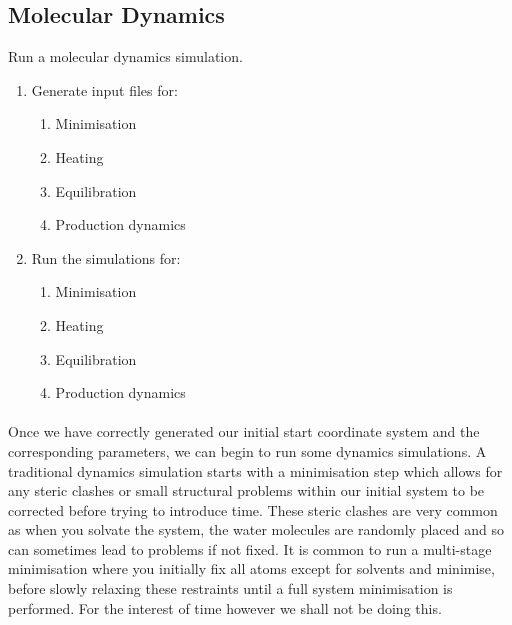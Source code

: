 \subsection{Molecular Dynamics}

    \begin{task}[label=task:Dynamics]{Run a molecular dynamics simulation.}
        \begin{enumerate}[label=(\alph*)]
            \item Generate input files for:
            \begin{enumerate}[label=(\roman*)]
                \item Minimisation
                \item Heating
                \item Equilibration
                \item Production dynamics
            \end{enumerate}
            \item Run the simulations for:
            \begin{enumerate}[label=(\roman*)]
                \item Minimisation
                \item Heating
                \item Equilibration
                \item Production dynamics
            \end{enumerate}
        \end{enumerate}
    \end{task}


    \paragraph{}
        Once we have correctly generated our initial start coordinate system and the corresponding parameters, we can begin to run some dynamics simulations. A traditional dynamics simulation starts with a minimisation step which allows for any steric clashes or small structural problems within our initial system to be corrected before trying to introduce time. These steric clashes are very common as when you solvate the system, the water molecules are randomly placed and so can sometimes lead to problems if not fixed. It is common to run a multi-stage minimisation where you initially fix all atoms except for solvents and minimise, before slowly relaxing these restraints until a full system minimisation is performed. For the interest of time however we shall not be doing this.

